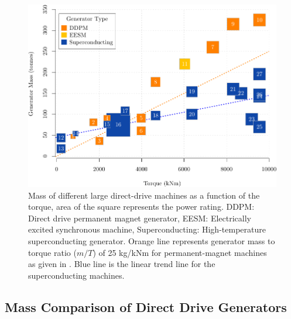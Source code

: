 \documentclass[12pt]{iopart}
\begin{document}
\begin{figure}[t]
\centering
\includegraphics[]{generator_mass_compare}
\caption{Mass of different large direct-drive machines as a function of the torque, area of the square represents the power rating.
 DDPM: Direct drive permanent magnet generator, EESM: Electrically excited synchronous machine, Superconducting: High-temperature superconducting generator. Orange line represents generator mass to torque ratio ($m/T$) of 25 kg/kNm for permanent-magnet machines as given in \cite{Bang2008}. Blue line is the linear trend line for the superconducting machines.}
\label{generators_mass_comparison}
\end{figure}

 \subsection{Mass Comparison of Direct Drive Generators}
 \label{mass-comparison-section}
\end{document}
